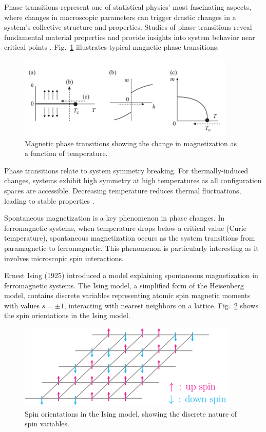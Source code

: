 \documentclass[conference, compsoc, twoside]{IEEEtran}
\begin{document}
Phase transitions represent one of statistical physics' most fascinating aspects, where changes in macroscopic parameters can trigger drastic changes in a system's collective structure and properties. Studies of phase transitions reveal fundamental material properties and provide insights into system behavior near critical points \cite{Tokura2019}. Fig.~\ref{fig:magnetic_phase_transition} illustrates typical magnetic phase transitions.

\begin{figure}[t]
    \centering
    \includegraphics[width=0.9\columnwidth]{Gambar 4. Perubahan Fase Magnetik.png}
    \caption{Magnetic phase transitions showing the change in magnetization as a function of temperature.}
    \label{fig:magnetic_phase_transition}
\end{figure}

Phase transitions relate to system symmetry breaking. For thermally-induced changes, systems exhibit high symmetry at high temperatures as all configuration spaces are accessible. Decreasing temperature reduces thermal fluctuations, leading to stable properties \cite{Surungan2017}.

Spontaneous magnetization is a key phenomenon in phase changes. In ferromagnetic systems, when temperature drops below a critical value (Curie temperature), spontaneous magnetization occurs as the system transitions from paramagnetic to ferromagnetic. This phenomenon is particularly interesting as it involves microscopic spin interactions.

Ernest Ising (1925) introduced a model explaining spontaneous magnetization in ferromagnetic systems. The Ising model, a simplified form of the Heisenberg model, contains discrete variables representing atomic spin magnetic moments with values $s = \pm 1$, interacting with nearest neighbors on a lattice. Fig.~\ref{fig:ising_model} shows the spin orientations in the Ising model.

\begin{figure}[t]
    \centering
    \includegraphics[width=0.9\columnwidth]{Gambar 5. Spin pada Model Ising.png}
    \caption{Spin orientations in the Ising model, showing the discrete nature of spin variables.}
    \label{fig:ising_model}
\end{figure}
\end{document}
